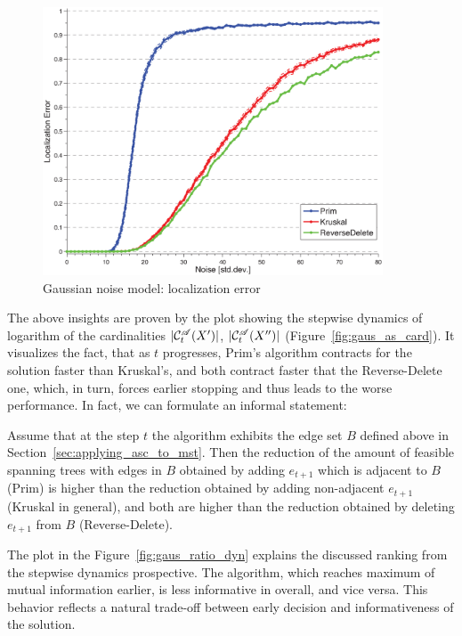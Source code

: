 \begin{figure}[!t]
\centering
\includegraphics[width=0.9\textwidth]{figures/ch_mst/gaus_loc_err_mod}
\caption{Gaussian noise model: localization error}
\label{fig:gaus_loc_err}
\end{figure}

The above insights are proven by the plot showing the stepwise
dynamics of logarithm of the cardinalities $|{\cal C}^{\mathscr{A}}_t(X')|$, $|{\cal C}^{\mathscr{A}}_t(X'')|$
(Figure~\ref{fig:gaus_as_card}). It visualizes the
fact, that as $t$ progresses, Prim's algorithm contracts for the
solution faster than Kruskal's, and both contract faster that the
Reverse-Delete one, which, in turn, forces earlier stopping and thus
leads to the worse performance. In fact, we can formulate an informal statement:
\begin{statement}
  Assume that at the step $t$ the algorithm exhibits the edge set $B$ defined
  above in Section~\ref{sec:applying_asc_to_mst}. Then the reduction of the
  amount of feasible spanning trees with edges in $B$ obtained by adding
  $e_{t+1}$ which is adjacent to $B$  (Prim) is higher than the reduction
  obtained by adding non-adjacent $e_{t+1}$ (Kruskal in general), and both are
  higher than the reduction obtained by deleting $e_{t+1}$ from $B$
  (Reverse-Delete).
\end{statement}

The plot in the Figure~\ref{fig:gaus_ratio_dyn} explains the discussed ranking
from the stepwise dynamics prospective. The algorithm, which reaches maximum of
mutual information earlier, is less informative in overall, and vice versa. This
behavior reflects a natural trade-off between early decision and informativeness of the
solution.

